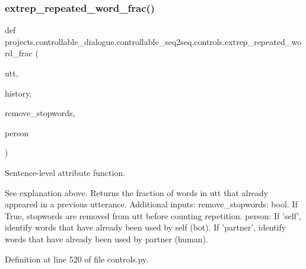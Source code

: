 \mbox{\label{namespaceprojects_1_1controllable__dialogue_1_1controllable__seq2seq_1_1controls_a0d42f675e7a8008b5300de33d6b393b1}} 
\subsubsection{\texorpdfstring{extrep\+\_\+repeated\+\_\+word\+\_\+frac()}{extrep\_repeated\_word\_frac()}}
{\footnotesize\ttfamily def projects.\+controllable\+\_\+dialogue.\+controllable\+\_\+seq2seq.\+controls.\+extrep\+\_\+repeated\+\_\+word\+\_\+frac (\begin{DoxyParamCaption}\item[{}]{utt,  }\item[{}]{history,  }\item[{}]{remove\+\_\+stopwords,  }\item[{}]{person }\end{DoxyParamCaption})}

\begin{DoxyVerb}Sentence-level attribute function.

See explanation above.
Returns the fraction of words in utt that already appeared in a previous utterance.
Additional inputs:
  remove_stopwords: bool. If True, stopwords are removed from utt before counting
    repetition.
  person: If 'self', identify words that have already been used by self (bot).
    If 'partner', identify words that have already been used by partner (human).
\end{DoxyVerb}
 

Definition at line 520 of file controls.\+py.


